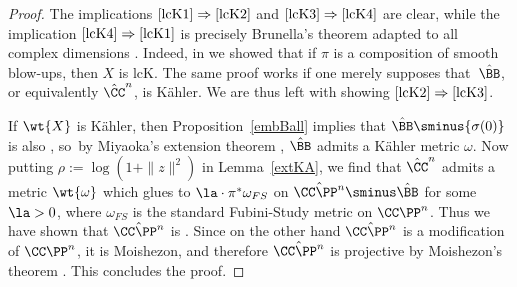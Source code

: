 \begin{proof}
The implications $\eqref{lcK1}\Rightarrow\eqref{lcK2}$ and $\eqref{lcK3}\Rightarrow\eqref{lcK4}$ are clear, while the implication $\eqref{lcK4}\Rightarrow \eqref{lcK1}$ is precisely Brunella's theorem \cite{bru} adapted to all complex dimensions \cite[Th.\,2.2]{iop}. Indeed, in \cite[Th.\,2.2]{iop} we showed that if $\pi$ is a composition of smooth blow-ups, then $X$ is lcK. The same proof works if one merely supposes that~$\hat\BB$, or equivalently $\hat\CC^n$, is Kähler. We are thus left with showing $\eqref{lcK2} \Rightarrow \eqref{lcK3}$.

If $\wt{X}$ is Kähler, then Proposition~\ref{embBall} implies that $\hat\BB\sminus \{\sigma(0)\}$ is also \Ka, so~by Miyaoka's extension theorem \cite[Prop.\,A]{miyaoka}, $\hat\BB$ admits a Kähler metric $\omega$. Now putting $\rho:=\log(1+\|z\|^2)$ in Lemma~\ref{extKA}, we find that $\hat\CC^n$ admits a \Ka metric $\wt{\omega}$ which glues to $\la\cdot\pi^*\omega_{FS}$ on $\hat{\CC\PP^n}\sminus \hat\BB$ for some $\la>0$, where $\omega_{FS}$ is the standard Fubini-Study metric on $\CC\PP^n$. Thus we have shown that $\hat{\CC\PP^n}$ is \Ka. Since on the other hand $\hat{\CC\PP^n}$ is a modification of $\CC\PP^n$, it is Moishezon, and therefore $\hat{\CC\PP^n}$ is projective by Moishezon's theorem \cite[Chap.\,I, Th.\,11]{moi}. This concludes the proof.
\end{proof}
